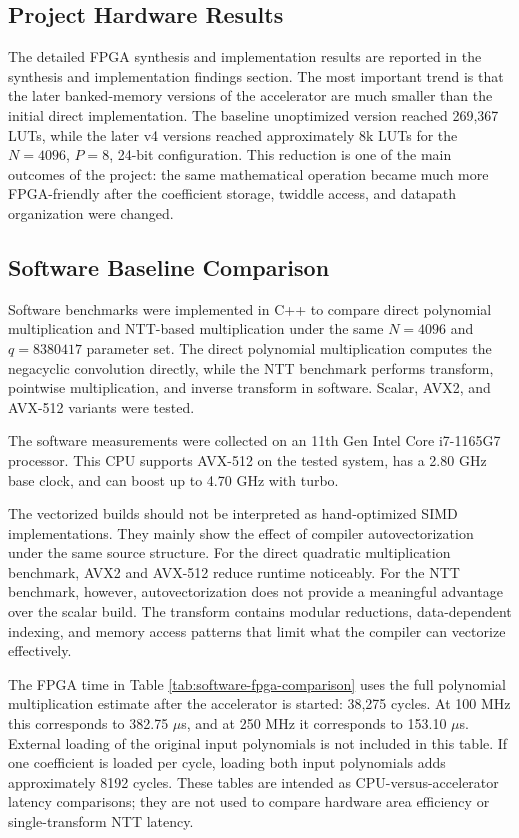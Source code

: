 \documentclass[a4paper, 12pt, titlepage]{article}
\begin{document}
\subsection{Project Hardware Results}

The detailed FPGA synthesis and implementation results are reported in the
synthesis and implementation findings section. The most important trend is that the later
banked-memory versions of the accelerator are much smaller than the initial
direct implementation. The baseline unoptimized version reached 269,367 LUTs,
while the later v4 versions reached approximately 8k LUTs for the \(N=4096\),
\(P=8\), 24-bit configuration. This reduction is one of the main outcomes of the
project: the same mathematical operation became much more FPGA-friendly after
the coefficient storage, twiddle access, and datapath organization were changed.

\subsection{Software Baseline Comparison}

Software benchmarks were implemented in C++ to compare direct polynomial
multiplication and NTT-based multiplication under the same $N=4096$ and
$q=8380417$ parameter set. The direct polynomial multiplication computes the
negacyclic convolution directly, while the NTT benchmark performs transform,
pointwise multiplication, and inverse transform in software. Scalar, AVX2, and
AVX-512 variants were tested.

The software measurements were collected on an 11th Gen Intel Core i7-1165G7
processor. This CPU supports AVX-512 on the tested system, has a 2.80 GHz base
clock, and can boost up to 4.70 GHz with turbo.

The vectorized builds should not be interpreted as hand-optimized SIMD
implementations. They mainly show the effect of compiler autovectorization under
the same source structure. For the direct quadratic multiplication benchmark,
AVX2 and AVX-512 reduce runtime noticeably. For the NTT benchmark, however,
autovectorization does not provide a meaningful advantage over the scalar build.
The transform contains modular reductions, data-dependent indexing, and memory
access patterns that limit what the compiler can vectorize effectively.

The FPGA time in Table \ref{tab:software-fpga-comparison} uses the full
polynomial multiplication estimate after the accelerator is started:
38,275 cycles. At 100 MHz this corresponds to 382.75 $\mu$s, and at 250 MHz it
corresponds to 153.10 $\mu$s. External loading of the original input
polynomials is not included in this table. If one coefficient is loaded per
cycle, loading both input polynomials adds approximately 8192 cycles. These
tables are intended as CPU-versus-accelerator latency comparisons;
they are not used to compare hardware area efficiency or single-transform NTT
latency.
\end{document}
